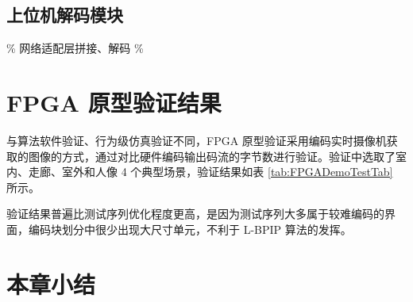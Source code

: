 \subsection{上位机解码模块}
\% 网络适配层拼接、解码 \%

\section{FPGA 原型验证结果}
与算法软件验证、行为级仿真验证不同，FPGA 原型验证采用编码实时摄像机获取的图像的方式，通过对比硬件编码输出码流的字节数进行验证。验证中选取了室内、走廊、室外和人像 4 个典型场景，验证结果如表 \ref{tab:FPGADemoTestTab} 所示。


验证结果普遍比测试序列优化程度更高，是因为测试序列大多属于较难编码的界面，编码块划分中很少出现大尺寸单元，不利于 L-BPIP 算法的发挥。

\section{本章小结}